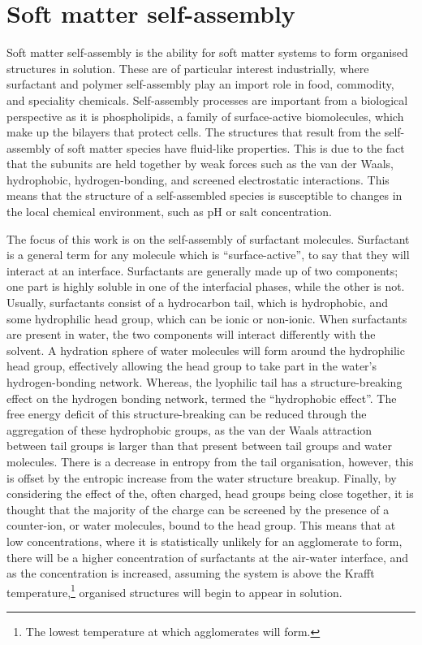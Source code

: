 \section{Soft matter self-assembly}
Soft matter self-assembly is the ability for soft matter systems to form organised structures in solution.
These are of particular interest industrially, where surfactant and polymer self-assembly play an import role in food, commodity, and speciality chemicals.\autocite{schramm_surfactants_2003}
Self-assembly processes are important from a biological perspective as it is phospholipids, a family of surface-active biomolecules, which make up the bilayers that protect cells.\autocite{simons_lipid_2000}
The structures that result from the self-assembly of soft matter species have fluid-like properties.
This is due to the fact that the subunits are held together by weak forces such as the van der Waals, hydrophobic, hydrogen-bonding, and screened electrostatic interactions.\autocite{israelachvili_intermolecular_2011}
This means that the structure of a self-assembled species is susceptible to changes in the local chemical environment, such as pH or salt concentration.\autocite{schmaljohann_thermo-_2006,sammalkorpi_ionic_2009}

The focus of this work is on the self-assembly of surfactant molecules.
Surfactant is a general term for any molecule which is ``surface-active'', to say that they will interact at an interface.\autocite{rosen_surfactants_2012}
Surfactants are generally made up of two components; one part is highly soluble in one of the interfacial phases, while the other is not.\autocite{goodwin_colloids_2009}
Usually, surfactants consist of a hydrocarbon tail, which is hydrophobic, and some hydrophilic head group, which can be ionic or non-ionic.
When surfactants are present in water, the two components will interact differently with the solvent.
A hydration sphere of water molecules will form around the hydrophilic head group, effectively allowing the head group to take part in the water's hydrogen-bonding network.
Whereas, the lyophilic tail has a structure-breaking effect on the hydrogen bonding network, termed the ``hydrophobic effect''.
The free energy deficit of this structure-breaking can be reduced through the aggregation of these hydrophobic groups, as the van der Waals attraction between tail groups is larger than that present between tail groups and water molecules.
There is a decrease in entropy from the tail organisation, however, this is offset by the entropic increase from the water structure breakup.
Finally, by considering the effect of the, often charged, head groups being close together, it is thought that the majority of the charge can be screened by the presence of a counter-ion, or water molecules, bound to the head group.\autocite{goodwin_colloids_2009}
This means that at low concentrations, where it is statistically unlikely for an agglomerate to form, there will be a higher concentration of surfactants at the air-water interface, and as the concentration is increased, assuming the system is above the Krafft temperature,\footnote{The lowest temperature at which agglomerates will form.} organised structures will begin to appear in solution.

